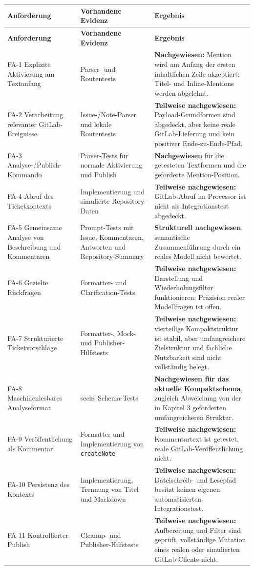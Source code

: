 \begin{longtable}{@{}>{\raggedright\arraybackslash}p{}>{\raggedright\arraybackslash}p{}>{\raggedright\arraybackslash}p{}@{}}
\toprule
\textbf{Anforderung} & \textbf{Vorhandene Evidenz} & \textbf{Ergebnis} \\
\midrule
\endfirsthead
\toprule
\textbf{Anforderung} & \textbf{Vorhandene Evidenz} & \textbf{Ergebnis} \\
\midrule
\endhead
FA-1 Explizite Aktivierung am Textanfang & Parser- und Routentests & \textbf{Nachgewiesen:} Mention wird am Anfang der ersten inhaltlichen Zeile akzeptiert; Titel- und Inline-Mentions werden abgelehnt. \\
FA-2 Verarbeitung relevanter GitLab-Ereignisse & Issue-/Note-Parser und lokale Routentests & \textbf{Teilweise nachgewiesen:} Payload-Grundformen sind abgedeckt, aber keine reale GitLab-Lieferung und kein positiver Ende-zu-Ende-Pfad. \\
FA-3 Analyse-/Publish-Kommando & Parser-Tests für normale Aktivierung und Publish & \textbf{Nachgewiesen} für die getesteten Textformen und die geforderte Mention-Position. \\
FA-4 Abruf des Ticketkontexts & Implementierung und simulierte Repository-Daten & \textbf{Teilweise nachgewiesen:} GitLab-Abruf im Processor ist nicht als Integrationstest abgedeckt. \\
FA-5 Gemeinsame Analyse von Beschreibung und Kommentaren & Prompt-Tests mit Issue, Kommentaren, Antworten und Repository-Summary & \textbf{Strukturell nachgewiesen}, semantische Zusammenführung durch ein reales Modell nicht bewertet. \\
FA-6 Gezielte Rückfragen & Formatter- und Clarification-Tests & \textbf{Teilweise nachgewiesen:} Darstellung und Wiederholungsfilter funktionieren; Präzision realer Modellfragen ist offen. \\
FA-7 Strukturierte Ticketvorschläge & Formatter-, Mock- und Publisher-Hilfstests & \textbf{Teilweise nachgewiesen:} vierteilige Kompaktstruktur ist stabil, aber umfangreichere Zielstruktur und fachliche Nutzbarkeit sind nicht vollständig belegt. \\
FA-8 Maschinenlesbares Analyseformat & sechs Schema-Tests & \textbf{Nachgewiesen für das aktuelle Kompaktschema}, zugleich Abweichung von der in Kapitel 3 geforderten umfangreicheren Struktur. \\
FA-9 Veröffentlichung als Kommentar & Formatter und Implementierung von \texttt{createNote} & \textbf{Teilweise nachgewiesen:} Kommentartext ist getestet, reale GitLab-Veröffentlichung nicht. \\
FA-10 Persistenz des Kontexts & Implementierung, Trennung von Titel und Markdown & \textbf{Teilweise nachgewiesen:} Dateischreib- und Lesepfad besitzt keinen eigenen automatisierten Integrationstest. \\
FA-11 Kontrollierter Publish & Cleanup- und Publisher-Hilfstests & \textbf{Teilweise nachgewiesen:} Aufbereitung und Filter sind geprüft, vollständige Mutation eines realen oder simulierten GitLab-Clients nicht. \\
\bottomrule
\end{longtable}


